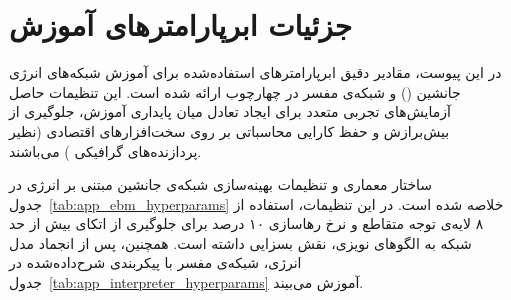 
\section{جزئیات ابرپارامترهای آموزش}\label{app:appendix_hyperparams}

در این پیوست، مقادیر دقیق ابرپارامترهای استفاده‌شده برای آموزش شبکه‌های انرژی جانشین () و شبکه‌ی مفسر در چهارچوب  ارائه شده است. این تنظیمات حاصل آزمایش‌های تجربی متعدد برای ایجاد تعادل میان پایداری آموزش، جلوگیری از بیش‌برازش و حفظ کارایی محاسباتی بر روی سخت‌افزارهای اقتصادی (نظیر پردازنده‌های گرافیکی ) می‌باشند. 

ساختار معماری و تنظیمات بهینه‌سازی شبکه‌ی جانشین مبتنی بر انرژی در جدول~\ref{tab:app_ebm_hyperparams} خلاصه شده است. در این تنظیمات، استفاده از ۸ لایه‌ی توجه متقاطع و نرخ رهاسازی ۱۰ درصد برای جلوگیری از اتکای بیش از حد شبکه به الگوهای نویزی، نقش بسزایی داشته است. همچنین، پس از انجماد مدل انرژی، شبکه‌ی مفسر با پیکربندی شرح‌داده‌شده در جدول~\ref{tab:app_interpreter_hyperparams} آموزش می‌بیند.

